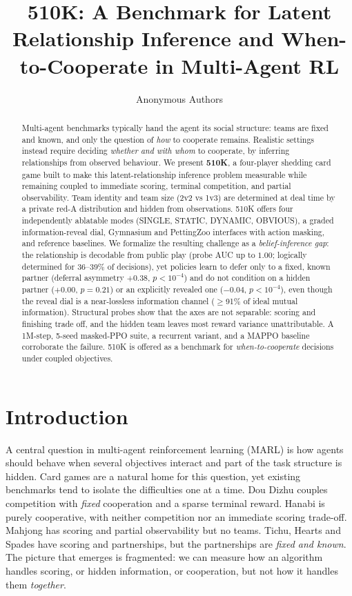 \documentclass{article}
\title{510K: A Benchmark for Latent Relationship Inference and
When-to-Cooperate in Multi-Agent RL}
\author{Anonymous Authors}
\date{}
\begin{document}
\maketitle

\begin{abstract}
Multi-agent benchmarks typically hand the agent its social structure: teams are
fixed and known, and only the question of \emph{how} to cooperate remains.
Realistic settings instead require deciding \emph{whether and with whom} to
cooperate, by inferring relationships from observed behaviour. We present
\textbf{510K}, a four-player shedding card game built to make this
latent-relationship inference problem measurable while remaining coupled to
immediate scoring, terminal competition, and partial observability. Team
identity and team size (2v2 vs 1v3) are determined at deal time by a private
red-A distribution and hidden from observations. 510K offers four independently
ablatable modes (SINGLE, STATIC, DYNAMIC, OBVIOUS), a graded information-reveal
dial, Gymnasium and PettingZoo interfaces with action masking, and reference
baselines. We formalize the resulting challenge as a \emph{belief-inference gap}:
the relationship is decodable from public play (probe AUC up to $1.00$;
logically determined for 36--39\% of decisions), yet policies learn to defer
only to a fixed, known partner (deferral asymmetry $+0.38$, $p<10^{-4}$) and do
not condition on a hidden partner ($+0.00$, $p=0.21$) or an explicitly revealed
one ($-0.04$, $p<10^{-4}$), even though the reveal dial is a near-lossless
information channel ($\ge$91\% of ideal mutual information). Structural probes
show that the axes are not separable: scoring and finishing trade off, and the
hidden team leaves most reward variance unattributable. A 1M-step, 5-seed
masked-PPO suite, a recurrent variant, and a MAPPO baseline corroborate the
failure. 510K is
offered as a benchmark for \emph{when-to-cooperate} decisions under coupled
objectives.
\end{abstract}

\section{Introduction}
A central question in multi-agent reinforcement learning (MARL) is how agents
should behave when several objectives interact and part of the task structure is
hidden. Card games are a natural home for this question, yet existing benchmarks
tend to isolate the difficulties one at a time. Dou Dizhu \citep{douzero}
couples competition with \emph{fixed} cooperation and a sparse terminal reward.
Hanabi \citep{hanabi} is purely cooperative, with neither competition nor an
immediate scoring trade-off. Mahjong \citep{suphx} has scoring and partial
observability but no teams. Tichu, Hearts and Spades have scoring and
partnerships, but the partnerships are \emph{fixed and known}. The picture that
emerges is fragmented: we can measure how an algorithm handles scoring, or
hidden information, or cooperation, but not how it handles them
\emph{together}.
\end{document}
